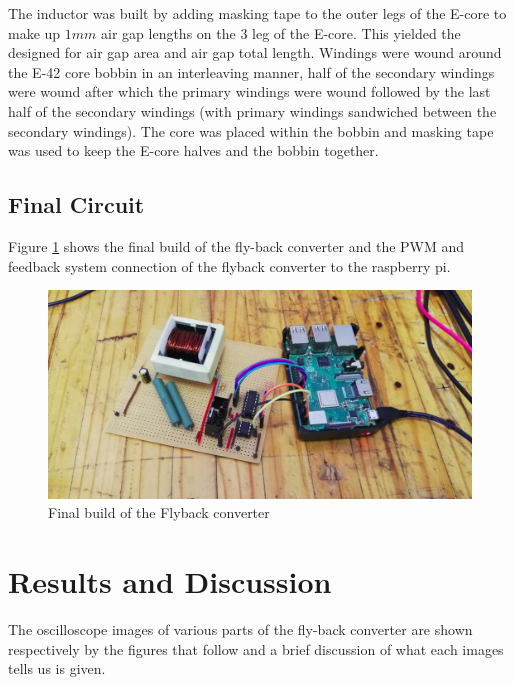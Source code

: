 \documentclass[a4paper, 12pt]{article}
\begin{document}
\noindent
The inductor was built by adding masking tape to the outer legs of the E-core to make up $1mm$ air gap lengths on the $3$ leg of the E-core. This yielded the designed for air gap area and air gap total length. Windings were wound around the  E-42 core bobbin in an interleaving manner, half of the secondary windings were wound after which the primary windings were wound followed by the last half of the secondary windings (with  primary windings sandwiched between the secondary windings). The core was placed within the bobbin and masking tape was used to keep the E-core halves and the bobbin together. 



\subsection{Final Circuit}
Figure \ref{fig:flyback_converter_build} shows the final build of the fly-back converter and the PWM and feedback system connection of the flyback converter to the raspberry pi.
\begin{figure}[H]
  \centering
  \includegraphics[width=\textwidth]{images/final_circuit_image.png}
  \caption{Final build of the Flyback converter}
  \label{fig:flyback_converter_build}
\end{figure}


\section{Results and Discussion}
The oscilloscope images of various parts of the fly-back converter are shown respectively by the figures that follow and a brief discussion of what each images tells us is given.
\end{document}
